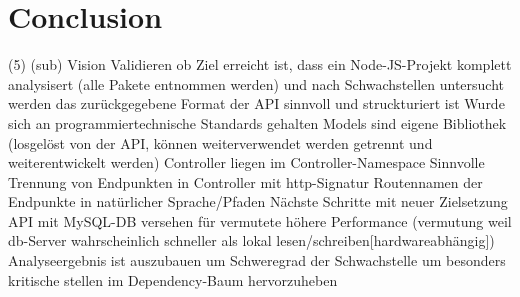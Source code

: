 \section{Conclusion} \label{sec:Conclusion}
    (5)
    (sub)
    Vision
        Validieren ob Ziel erreicht ist, dass
            ein Node-JS-Projekt komplett analysisert (alle Pakete entnommen werden) und nach Schwachstellen untersucht werden
            das zurückgegebene Format der API sinnvoll und struckturiert ist
            Wurde sich an programmiertechnische Standards gehalten
                Models sind eigene Bibliothek (losgelöst von der API, können weiterverwendet werden getrennt und weiterentwickelt werden)
                Controller liegen im Controller-Namespace
                Sinnvolle Trennung von Endpunkten in Controller mit http-Signatur
                Routennamen der Endpunkte in natürlicher Sprache/Pfaden
        Nächste Schritte mit neuer Zielsetzung
            API mit MySQL-DB versehen für vermutete höhere Performance (vermutung weil db-Server wahrscheinlich schneller als lokal lesen/schreiben[hardwareabhängig])
            Analyseergebnis ist auszubauen um Schweregrad der Schwachstelle um besonders kritische stellen im Dependency-Baum hervorzuheben
            